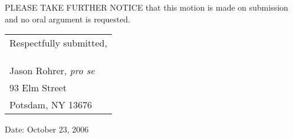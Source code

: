 \documentclass[12pt]{article}
\begin{document}
\noindent PLEASE TAKE FURTHER NOTICE that this motion is made on submission and no oral argument is requested.

\singlespacing

\begin{flushright}
\begin{tabular}{l}
Respectfully submitted,\\
\\
\\
\hline
\\
Jason Rohrer, {\em pro se}\\
93 Elm Street\\
Potsdam, NY 13676
\end{tabular}
\end{flushright}
Date: October 23, 2006
\end{document}
